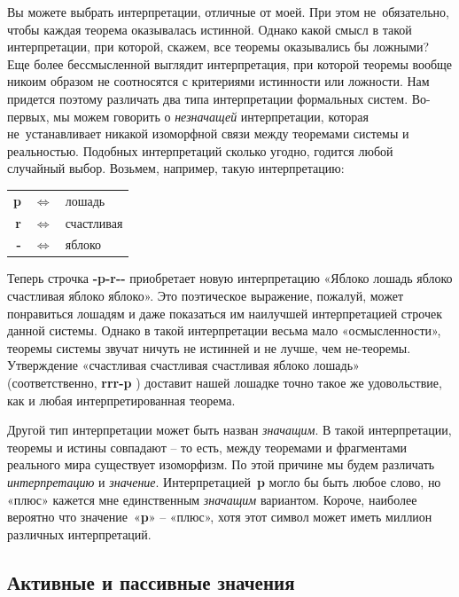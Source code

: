 \documentclass[../main.tex]{subfiles}
\begin{document}
Вы можете выбрать интерпретации, отличные от моей. При этом не~обязательно, чтобы каждая теорема оказывалась истинной. Однако какой смысл в такой интерпретации, при которой, скажем, все теоремы оказывались бы ложными? Еще более бессмысленной выглядит интерпретация, при которой теоремы вообще никоим образом не соотносятся с критериями истинности или ложности. Нам придется поэтому различать два типа интерпретации формальных систем. Во-первых, мы можем говорить о \emph{незначащей} интерпретации, которая не~устанавливает никакой изоморфной связи между теоремами системы и реальностью.
Подобных интерпретаций сколько угодно, годится любой случайный выбор.
Возьмем, например, такую интерпретацию:
\begin{center}
    \setlength{\tabcolsep}{4pt}
    \begin{tabular}{r c l}
        \textbf{p} & $\Longleftrightarrow$ & лошадь \\
        \textbf{r} & $\Longleftrightarrow$ & счастливая \\
        \textbf{-} & $\Longleftrightarrow$ & яблоко \\
    \end{tabular}
\end{center}

Теперь строчка \textbf{-p-r-{}-} приобретает новую интерпретацию «Яблоко лошадь яблоко счастливая яблоко яблоко».
Это поэтическое выражение, пожалуй, может понравиться лошадям и даже показаться им наилучшей интерпретацией строчек данной системы.
Однако в такой интерпретации весьма мало «осмысленности», теоремы системы звучат ничуть не истинней и не лучше, чем не-теоремы.
Утверждение «счастливая счастливая счастливая яблоко лошадь» (соответственно, \textbf{rrr-p} ) доставит нашей лошадке точно такое же удовольствие, как и любая интерпретированная теорема.

Другой тип интерпретации может быть назван \emph{значащим}.
В такой интерпретации, теоремы и истины совпадают \--- то есть, между теоремами и фрагментами реального мира существует изоморфизм.
По этой причине мы будем различать \emph{интерпретацию} и \emph{значение}.
Интерпретацией~\textbf{p} могло бы быть любое слово, но «плюс» кажется мне единственным \emph{значащим} вариантом.
Короче, наиболее вероятно что значение~«\textbf{p}» \--- «плюс», хотя этот символ может иметь миллион различных интерпретаций.


\subsection{Активные и пассивные значения}
\end{document}
